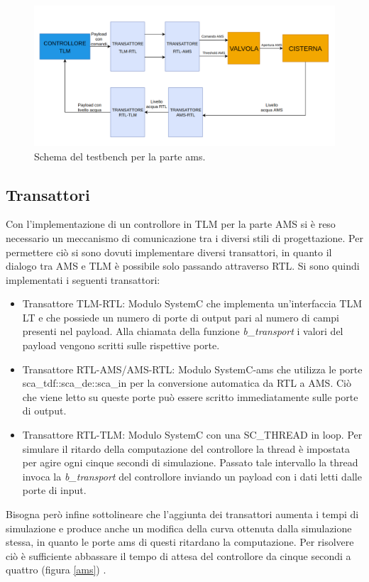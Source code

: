 \documentclass[]{IEEEtran}
\begin{document}
\begin{figure}[ht]
	\centering
	\includegraphics[width=\textwidth]{Images/scheme9.png}
	\caption{Schema del testbench per la parte ams.}
	\label{scheme9}
\end{figure}

\subsection{Transattori}
Con l'implementazione di un controllore in TLM per la parte AMS si è reso necessario un meccanismo di comunicazione tra i diversi stili di progettazione. Per permettere ciò si sono dovuti implementare diversi transattori, in quanto il dialogo tra AMS e TLM è possibile solo passando attraverso RTL.
Si sono quindi implementati i seguenti transattori:
\begin{itemize}
	\item Transattore TLM-RTL: Modulo SystemC che implementa un'interfaccia TLM LT e che possiede un numero di porte di output pari al numero di campi presenti nel payload. Alla chiamata della funzione \emph{b\_transport} i valori del payload vengono scritti sulle rispettive porte.
	\item Transattore RTL-AMS/AMS-RTL: Modulo SystemC-ams che utilizza le porte sca\_tdf::sca\_de::sca\_in per la conversione automatica da RTL a AMS. Ciò che viene letto su queste porte può essere scritto immediatamente sulle porte di output.
	\item Transattore RTL-TLM: Modulo SystemC con una SC\_THREAD in loop. Per simulare il ritardo della computazione del controllore la thread è impostata per agire ogni cinque secondi di simulazione. Passato tale intervallo la thread invoca la \emph{b\_transport} del controllore inviando un payload con i dati letti dalle porte di input.
\end{itemize}
Bisogna però infine sottolineare che l'aggiunta dei transattori aumenta i tempi di simulazione e produce anche un modifica della curva ottenuta dalla simulazione stessa, in quanto le porte ams di questi ritardano la computazione. Per risolvere ciò è sufficiente abbassare il tempo di attesa del controllore da cinque secondi a quattro (figura \ref{ams}) .
\end{document}
